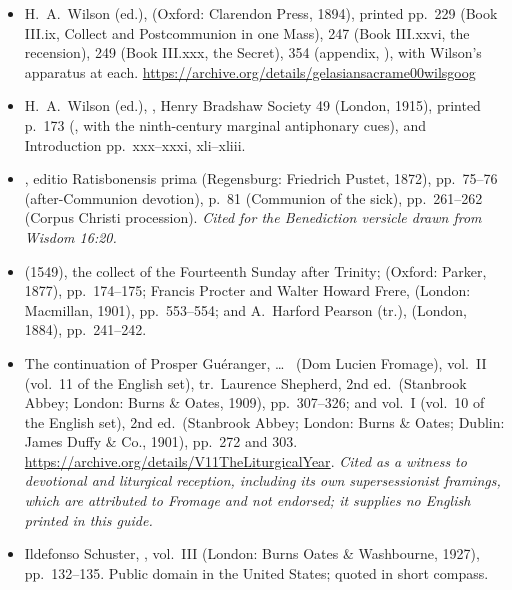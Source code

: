 \begin{itemize}[leftmargin=1.2em, itemsep=0.15em]
{negative for the Secret and Postcommunion.}
\item H.~A.\ Wilson (ed.),  (Oxford: Clarendon Press, 1894), printed
pp.~229 (Book III.ix, Collect and Postcommunion in one Mass), 247 (Book
III.xxvi, the  recension), 249 (Book III.xxx, the Secret), 354
(appendix, ), with Wilson's apparatus at
each. \url{https://archive.org/details/gelasiansacrame00wilsgoog}
\item H.~A.\ Wilson (ed.), , Henry Bradshaw Society 49 (London, 1915), printed p.~173
(, with the ninth-century
marginal antiphonary cues), and Introduction pp.~xxx--xxxi, xli--xliii.
\item {}, editio Ratisbonensis prima (Regensburg:
Friedrich Pustet, 1872), pp.~75--76 (after-Communion devotion), p.~81
(Communion of the sick), pp.~261--262 (Corpus Christi procession).
\textit{Cited for the Benediction versicle drawn from Wisdom 16:20.}
\item {} (1549), the collect of the Fourteenth
Sunday after Trinity;  (Oxford: Parker, 1877), pp.~174--175; Francis
Procter and Walter Howard Frere,  (London: Macmillan, 1901), pp.~553--554; and A.~Harford Pearson (tr.),
 (London, 1884), pp.~241--242.
\item The continuation of Prosper Guéranger,  \dots\
 (Dom Lucien Fromage), vol.~II (vol.~11 of the
English set), tr.\ Laurence Shepherd, 2nd ed.\ (Stanbrook Abbey; London: Burns
\& Oates, 1909), pp.~307--326; and vol.~I (vol.~10 of the English set), 2nd
ed.\ (Stanbrook Abbey; London: Burns \& Oates; Dublin: James Duffy \& Co.,
1901), pp.~272 and 303.
\url{https://archive.org/details/V11TheLiturgicalYear}. \textit{Cited as a
witness to devotional and liturgical reception, including its own
supersessionist framings, which are attributed to Fromage and not endorsed; it
supplies no English printed in this guide.}
\item Ildefonso Schuster, ,
vol.~III (London: Burns Oates \& Washbourne, 1927), pp.~132--135. Public
domain in the United States; quoted in short compass.
\end{itemize}

